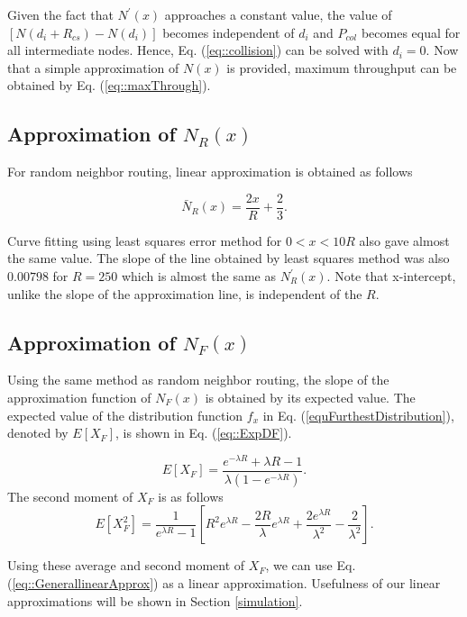 \documentclass[12pt, draftclsnofoot, onecolumn]{IEEEtran}
\begin{document}
Given the fact that $N^{\prime}(x)$ approaches a constant value, 
the value of $[N(d_i+R_{cs})-N(d_i)]$ becomes independent of 
$d_i$ and $P_{col}$ becomes equal for all intermediate nodes. 
Hence, Eq. (\ref{eq::collision}) can be solved with $d_i=0$. Now that a simple approximation of $N(x)$ is provided, maximum throughput can be obtained by Eq. (\ref{eq::maxThrough}). 


\subsection{Approximation of $N_R(x)$}

For random neighbor routing, linear approximation is obtained as follows

\begin{equation}
\label{uniformSumapproximation}
\bar{N}_R(x)= \frac{2x}{R} + \frac{2}{3}.
\end{equation}

Curve fitting using least squares error method
for $0<x<10R$ also gave almost 
the same value. The slope of the line obtained by least squares method 
was also $0.00798$ for $R=250$ which is almost the same as 
$N_R^{\prime}(x)$. Note that x-intercept, unlike the slope of the 
approximation line, is independent of the $R$.

\subsection{Approximation of $N_F(x)$}

Using the same method as random neighbor routing, the slope of the 
approximation function of $N_F(x)$ is obtained by its expected value. The expected value of the distribution function $f_x$ in Eq. 
(\ref{equFurthestDistribution}), denoted by $E[X_F]$, is shown in 
Eq. (\ref{eq::ExpDF}). 

\begin{equation}
\label{eq::ExpDF}
E[X_F]= \frac{e^{-\lambda R}+\lambda R - 1}{\lambda(1-e^{-\lambda R})}.
\end{equation}
The second moment of $X_F$ is as follows
\begin{equation}
\label{eq::ExpE2}
E[X^2_F]= \frac{1}{e^{\lambda R}-1} [ R^2 e^{\lambda R} - \frac{2R}{\lambda} e^{\lambda R} + \frac{2e^{\lambda R}}{\lambda^2}-\frac{2}{\lambda^2} ].
\end{equation}

Using these average and second moment of $X_F$, we can use Eq. (\ref{eq::GenerallinearApprox}) as a linear approximation.
 Usefulness of our linear approximations will be shown in Section \ref{simulation}.
\end{document}
